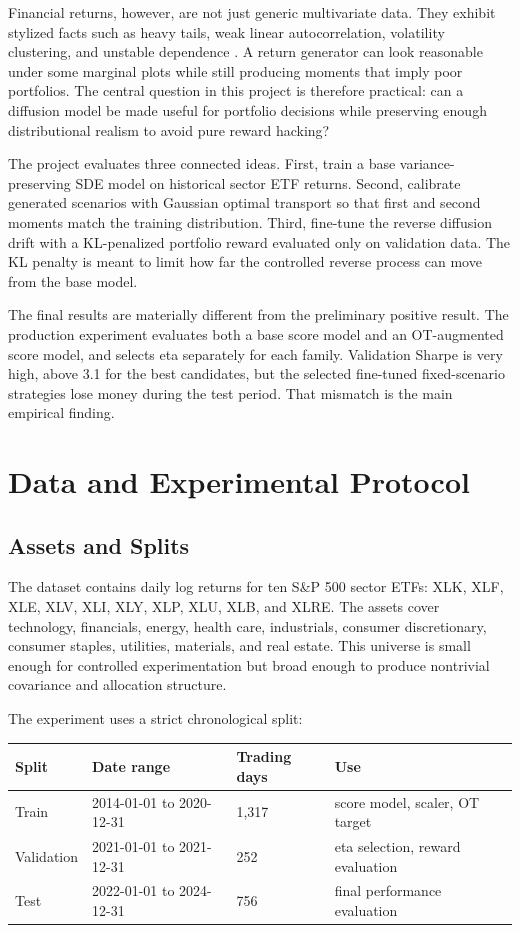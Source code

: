 \documentclass{article}
\begin{document}
Financial returns, however, are not just generic multivariate data. They exhibit
stylized facts such as heavy tails, weak linear autocorrelation, volatility
clustering, and unstable dependence \citep{cont2001}. A return generator can look
reasonable under some marginal plots while still producing moments that imply
poor portfolios. The central question in this project is therefore practical:
can a diffusion model be made useful for portfolio decisions while preserving
enough distributional realism to avoid pure reward hacking?

The project evaluates three connected ideas. First, train a base
variance-preserving SDE model on historical sector ETF returns. Second, calibrate
generated scenarios with Gaussian optimal transport so that first and second
moments match the training distribution. Third, fine-tune the reverse diffusion
drift with a KL-penalized portfolio reward evaluated only on validation data. The
KL penalty is meant to limit how far the controlled reverse process can move from
the base model.

The final results are materially different from the preliminary positive result.
The production experiment evaluates both a base score model and an OT-augmented
score model, and selects eta separately for each family. Validation Sharpe is
very high, above 3.1 for the best candidates, but the selected fine-tuned
fixed-scenario strategies lose money during the test period. That mismatch is
the main empirical finding.

\section{Data and Experimental Protocol}

\subsection{Assets and Splits}

The dataset contains daily log returns for ten S\&P 500 sector ETFs: XLK, XLF,
XLE, XLV, XLI, XLY, XLP, XLU, XLB, and XLRE. The assets cover technology,
financials, energy, health care, industrials, consumer discretionary, consumer
staples, utilities, materials, and real estate. This universe is small enough for
controlled experimentation but broad enough to produce nontrivial covariance and
allocation structure.

The experiment uses a strict chronological split:
\begin{center}
\begin{tabular}{llll}
\toprule
Split & Date range & Trading days & Use \\
\midrule
Train & 2014-01-01 to 2020-12-31 & 1,317 & score model, scaler, OT target \\
Validation & 2021-01-01 to 2021-12-31 & 252 & eta selection, reward evaluation \\
Test & 2022-01-01 to 2024-12-31 & 756 & final performance evaluation \\
\bottomrule
\end{tabular}
\end{center}
\end{document}
